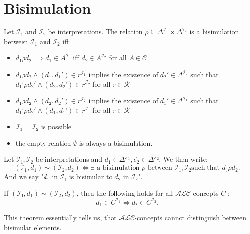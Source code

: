 \section{Bisimulation}
\begin{definition}
	Let $\mathcal{I}_1$ and $\mathcal{I}_2$ be interpretations.
	The relation $\rho \subseteq \Delta^{\mathcal{I}_{1}} \times \Delta^{\mathcal{I}_2}$ is a bisimulation between $\mathcal{I}_1$ and $\mathcal{I}_2$ iff:
	\begin{itemize}
		\item $d_1 \rho d_2 \implies d_1 \in A^{\mathcal{I}_1} \text{ iff } d_2 \in A^{\mathcal{I}_2}$ for all $A \in \mathscr{C}$
		\item $d_1 \rho d_2 \land  (d_1, d_1') \in r^{\mathcal{I}_1}$ implies the existence of $d_2' \in \Delta^{\mathcal{I}_2}$ such that
			$d_1' \rho d_2' \land (d_2, d_2') \in r^{\mathcal{I}_2}$ for all $r \in \mathscr{R}$
		\item $d_1 \rho d_2 \land  (d_2, d_2') \in r^{\mathcal{I}_2}$ implies the existence of $d_1' \in \Delta^{\mathcal{I}_1}$ such that
			$d_1' \rho d_2' \land (d_1, d_1') \in r^{\mathcal{I}_1}$ for all $r \in \mathscr{R}$
	\end{itemize}
\end{definition}

\begin{note}
	\begin{itemize}
		\item $\mathcal{I}_1 = \mathcal{I}_2$ is possible
		\item the empty relation $\emptyset$ is always a bisimulation.
	\end{itemize}
\end{note}

\begin{notation}
	Let $\mathcal{I}_1, \mathcal{I}_2$ be interpretations and $d_1 \in \Delta^{\mathcal{I}_1}, d_2 \in \Delta^{\mathcal{I}_2}$.
	We then write:
	\[
		\left( \mathcal{I}_1, d_1 \right) \sim \left( \mathcal{I}_2, d_2 \right) \iff \exists \text{ a bisimulation $\rho$ between  $\mathcal{I}_1, \mathcal{I}_2$
		such that $d_1 \rho d_2$}
	.\]
	And we say "$d_1$ in $\mathcal{I}_1$ is bisimular to $d_2$ in $\mathcal{I}_2$".
\end{notation}

\begin{theorem}\label{thm: bisimulation invariance}
	If $ \left( \mathcal{I}_1,d_1 \right) \sim \left( \mathcal{I}_2, d_2 \right)$, then the following holds for all $\mathcal{ALC}$-concepts $C$ :
	\[
		d_1 \in C^{\mathcal{I}_1} \iff d_2 \in C^{\mathcal{I}_2}
	.\]
\end{theorem}
This theorem essentially tells us, that $\mathcal{ALC}$-concepts cannot distinguish between bisimular elements.
